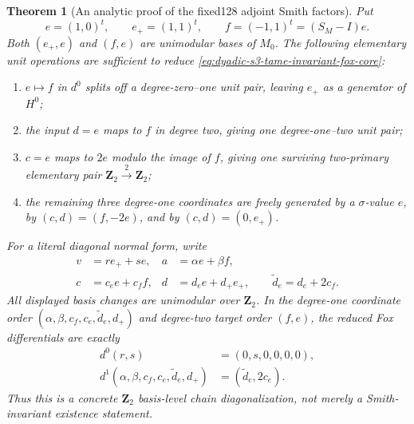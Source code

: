 \documentclass[11pt]{article}
\newtheorem{theorem}{Theorem}[section]
\theoremstyle{definition}
\begin{document}
\begin{theorem}[An analytic proof of the fixed128 adjoint Smith factors]
Put
\[
e=(1,0)^t,\qquad
e_+=(1,1)^t,\qquad
f=(-1,1)^t=(S_M-I)e.
\]
Both $(e_+,e)$ and $(f,e)$
are unimodular bases of $M_0$.
The following elementary
unit operations are sufficient
to reduce
\eqref{eq:dyadic-s3-tame-invariant-fox-core}:
\begin{enumerate}[label=\textnormal{(\roman*)}]
\item $e\mapsto f$ in $d^0$
splits off a degree-zero--one
unit pair, leaving $e_+$
as a generator of $H^0$;
\item the input $d=e$ maps
to $f$ in degree two,
giving one degree-one--two
unit pair;
\item $c=e$ maps to $2e$
modulo the image of $f$,
giving one surviving
two-primary elementary
pair $\mathbf Z_2\xrightarrow{2}\mathbf Z_2$;
\item the remaining three
degree-one coordinates
are freely generated
by a $\sigma$-value $e$,
by $(c,d)=(f,-2e)$,
and by $(c,d)=(0,e_+)$.
\end{enumerate}
For a literal diagonal normal form,
write
\begin{equation}\label{eq:dyadic-s3-adjoint-exact-fox-input-basis}
\begin{aligned}
v&=r e_++s e,&
a&=\alpha e+\beta f,\\
c&=c_e e+c_f f,&
d&=d_e e+d_+e_+,
\qquad \widetilde d_e=d_e+2c_f.
\end{aligned}
\end{equation}
All displayed basis changes are
unimodular over $\mathbf Z_2$.
In the degree-one coordinate order
$(\alpha,\beta,c_f,c_e,
\widetilde d_e,d_+)$ and
degree-two target order $(f,e)$,
the reduced Fox differentials
are \emph{exactly}
\begin{equation}\label{eq:dyadic-s3-adjoint-exact-fox-diagonal}
\boxed{
\begin{aligned}
d^0(r,s)&=(0,s,0,0,0,0),\\
d^1(\alpha,\beta,c_f,c_e,
   \widetilde d_e,d_+)
&=(\widetilde d_e,2c_e).
\end{aligned}}
\end{equation}
Thus this is a concrete
$\mathbf Z_2$ basis-level
chain diagonalization,
not merely a Smith-invariant
existence statement.


\end{theorem}
\end{document}
